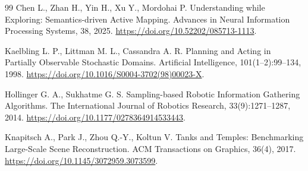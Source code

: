 \begin{thebibliography}{99}
 Chen L., Zhan H., Yin H., Xu Y., Mordohai P. Understanding while Exploring: Semantics-driven Active Mapping. Advances in Neural Information Processing Systems, 38, 2025. \url{https://doi.org/10.52202/085713-1113}.

 Kaelbling L. P., Littman M. L., Cassandra A. R. Planning and Acting in Partially Observable Stochastic Domains. Artificial Intelligence, 101(1--2):99--134, 1998. \url{https://doi.org/10.1016/S0004-3702(98)00023-X}.

 Hollinger G. A., Sukhatme G. S. Sampling-based Robotic Information Gathering Algorithms. The International Journal of Robotics Research, 33(9):1271--1287, 2014. \url{https://doi.org/10.1177/0278364914533443}.

 Knapitsch A., Park J., Zhou Q.-Y., Koltun V. Tanks and Temples: Benchmarking Large-Scale Scene Reconstruction. ACM Transactions on Graphics, 36(4), 2017. \url{https://doi.org/10.1145/3072959.3073599}.
\end{thebibliography}
